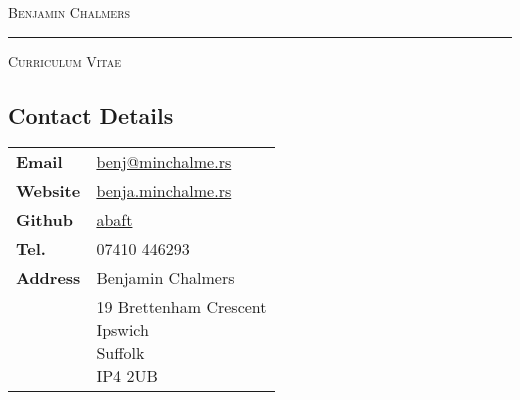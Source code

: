 \documentclass[9pt,a4paper]{article}
\begin{document}
\begin{center}

  \textsc{\Huge{Benjamin Chalmers}}
  \vspace{0.3cm}

  \noindent\rule{0.8\textwidth}{0.4pt}
  \vspace{0.3cm}

  \textsc{\large{Curriculum Vitae}}
  \vspace{0.2cm}

\end{center}
\begin{multicols*}{3}
  \section*{Contact Details} 
  \vspace{-0.5cm}
\begin{center}
  \begin{tabular}{p{1.2cm}p{6cm}}
    \textbf{Email}&\href{mailto:benj@minchalme.rs}{benj@minchalme.rs}\\
    \textbf{Website}&\href{http://benja.minchalme.rs/}{benja.minchalme.rs}\\
    \textbf{Github}&\href{http://github.com/abaft}{abaft}\\
    \textbf{Tel.}&07410 446293\\
    \textbf{Address}&Benjamin Chalmers\\
    &\parbox{5cm}{19 Brettenham Crescent\\Ipswich\\Suffolk\\IP4 2UB}\\
  \end{tabular}
\end{center}

  \vspace{-.5cm}

\end{multicols*}
\end{document}

